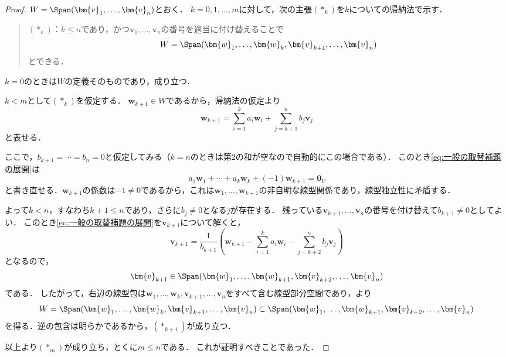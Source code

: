 \begin{leftbar}
\begin{proof}
  $W = \Span(\bm{v}_1, \dots, \bm{v}_n)$とおく．
  $k = 0, 1, \dots, m$に対して，次の主張$(\ast_k)$を$k$についての帰納法で示す．

  \begin{quote}
    $(\ast_k)$：$k \le n$であり，かつ$\bm{v}_1, \dots, \bm{v}_n$の番号を適当に付け替えることで
    \[
      W = \Span(\bm{w}_1, \dots, \bm{w}_k, \bm{v}_{k+1}, \dots, \bm{v}_n)
    \]
    とできる．
  \end{quote}

  $k = 0$のときは$W$の定義そのものであり，成り立つ．

  $k < m$として$(\ast_k)$を仮定する．
  $\bm{w}_{k+1} \in W$であるから，帰納法の仮定より
  \begin{equation}
    \bm{w}_{k+1}
    = \sum_{i=1}^{k} a_i \bm{w}_i + \sum_{j=k+1}^{n} b_j \bm{v}_j
    \label{eq:一般の取替補題の展開}
  \end{equation}
  と表せる．

  ここで，$b_{k+1} = \cdots = b_n = 0$と仮定してみる（$k = n$のときは第2の和が空なので自動的にこの場合である）．
  このとき\eqref{eq:一般の取替補題の展開}は
  \[
    a_1 \bm{w}_1 + \cdots + a_k \bm{w}_k + (-1)\bm{w}_{k+1} = \bm{0}_V
  \]
  と書き直せる．$\bm{w}_{k+1}$の係数は$-1 \ne 0$であるから，これは$\bm{w}_1, \dots, \bm{w}_{k+1}$の非自明な線型関係であり，線型独立性に矛盾する．

  よって$k < n$，すなわち$k + 1 \le n$であり，さらに$b_j \ne 0$となる$j$が存在する．
  残っている$\bm{v}_{k+1}, \dots, \bm{v}_n$の番号を付け替えて$b_{k+1} \ne 0$としてよい．
  このとき\eqref{eq:一般の取替補題の展開}を$\bm{v}_{k+1}$について解くと，
  \[
    \bm{v}_{k+1}
    = \frac{1}{b_{k+1}}\left( \bm{w}_{k+1} - \sum_{i=1}^{k} a_i \bm{w}_i - \sum_{j=k+2}^{n} b_j \bm{v}_j \right)
  \]
  となるので，
  \[
    \bm{v}_{k+1} \in \Span(\bm{w}_1, \dots, \bm{w}_{k+1}, \bm{v}_{k+2}, \dots, \bm{v}_n)
  \]
  である．
  したがって，右辺の線型包は$\bm{w}_1, \dots, \bm{w}_k, \bm{v}_{k+1}, \dots, \bm{v}_n$をすべて含む線型部分空間であり，より
  \[
    W = \Span(\bm{w}_1, \dots, \bm{w}_k, \bm{v}_{k+1}, \dots, \bm{v}_n)
    \subset \Span(\bm{w}_1, \dots, \bm{w}_{k+1}, \bm{v}_{k+2}, \dots, \bm{v}_n)
  \]
  を得る．逆の包含は明らかであるから，$(\ast_{k+1})$が成り立つ．

  以上より$(\ast_m)$が成り立ち，とくに$m \le n$である．
  これが証明すべきことであった．
\end{proof}
\end{leftbar}


